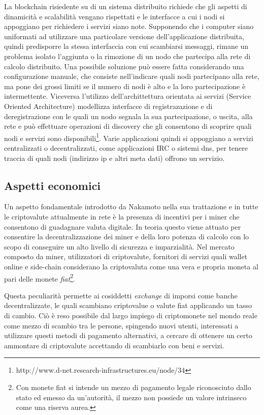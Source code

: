 	La blockchain risiedente su di un sistema distribuito richiede che gli aspetti di dinamicità e scalabilità vengano rispettati e le interfacce a cui i nodi si appoggiano per richiedere i servizi siano note. Supponendo che i computer siano uniformati ad utilizzare una particolare versione dell'applicazione distribuita, quindi predisporre la stessa interfaccia con cui scambiarsi messaggi, rimane un problema isolato l'aggiunta o la rimozione di un nodo che partecipa alla rete di calcolo distribuito. Una possibile soluzione può essere fatta considerando una configurazione manuale, che consiste nell'indicare quali nodi partecipano alla rete, ma pone dei grossi limiti se il numero di nodi è alto e la loro partecipazione è intermettente. Viceversa l'utilizzo dell'archittettura orientata ai servizi (Service Oriented Architecture) modellizza interfacce di registrazazione e di deregistrazione  con le quali un nodo segnala la sua partecipazione, o uscita, alla rete e può effettuare operazioni di discovery che gli consentono di scoprire quali nodi e servizi sono disponibili\footnote{http://www.d-net.research-infrastructures.eu/node/34}.
	Varie applicazioni quindi si appoggiano a servizi centralizzati o decentralizzati, come applicazioni IRC o sistemi dns, per tenere traccia di quali nodi (indirizzo ip e altri meta dati) offrono un servizio.
\fi





\subsection{Aspetti economici}

Un aspetto fondamentale introdotto da Nakamoto nella sua trattazione e in tutte le criptovalute attualmente in rete è la presenza di incentivi per i miner che consentono di guadagnare valuta digitale. In teoria questo viene attuato per consentire la decentralizzazione dei miner e della loro potenza di calcolo con lo scopo di conseguire un alto livello di sicurezza e imparzialità. Nel mercato composto da miner, utilizzatori di criptovalute, fornitori di servizi quali wallet online e side-chain considerano la criptovaluta come una vera e propria moneta al pari delle monete \textit{fiat}\footnote{Con monete fiat si intende un mezzo di pagamento legale riconosciuto dallo stato ed emesso da un'autorità, il mezzo non possiede un valore intrinseco come una riserva aurea.}.

Questa peculiarità permette ai cosiddetti \textit{exchange} di imporsi come banche decentralizzate, le quali scambiano criptovalue o valute fiat applicando un tasso di cambio. Ciò è reso possibile dal largo impiego di criptomonete nel mondo reale come mezzo di scambio tra le persone, spingendo nuovi utenti, interessati a utilizzare questi metodi di pagamento alternativi, a cercare di ottenere un certo ammontare di criptovalute accettando di scambiarlo con beni e servizi.

